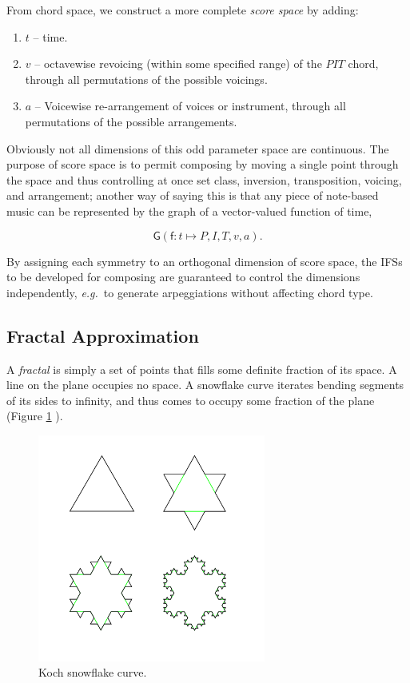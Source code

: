 \documentclass[english,11pt,letterpaper,onecolumn]{scrartcl}
\numberwithin{equation}{section}
\begin{document}
\noindent From chord space, we construct a more complete \textit{score space} by
adding:

\begin{enumerate}[resume]
\item $t$ -- time.
\item $v$ -- octavewise revoicing (within some specified range) of the $PIT$
chord, through all permutations of the possible voicings.
\item $a$ -- Voicewise re-arrangement of voices or instrument, through all
permutations of the possible arrangements.
\end{enumerate}

\noindent Obviously not all dimensions of this odd parameter space are
continuous. The purpose of score space is to permit composing by moving a
single point through the space and thus controlling at once set class,
inversion, transposition, voicing, and arrangement; another way of saying this
is that any piece of note-based music can be represented by the graph of a
vector-valued function of time,

$$\mathsf{G}(\mathsf{f}: t \mapsto P, I, T, v, a).$$

By assigning each symmetry to an orthogonal dimension of score space, the
IFSs to be developed for composing are guaranteed to control the dimensions
independently, \textit{e.g.}\ to generate arpeggiations without affecting
chord type.

\subsection{Fractal Approximation}

A \textit{fractal} is simply a set of points that fills some definite fraction
of its space. A line on the plane occupies no space. A snowflake curve
iterates bending segments of its sides to infinity, and thus comes to occupy
some fraction of the plane (Figure \ref{fig:kochflake}
\cite{Mandelbrot:1982:FGN}).

\begin{figure}
\centerline{\includegraphics[width = 0.6667\textwidth]{KochFlake}}
\caption{\label{fig:kochflake} Koch snowflake
curve.\protect\footnotemark}
\end{figure}
\end{document}
